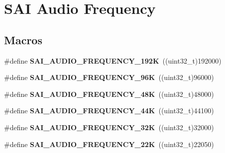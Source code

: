 \hypertarget{group___s_a_i___audio___frequency}{}\section{S\+AI Audio Frequency}
\label{group___s_a_i___audio___frequency}
\subsection*{Macros}
\begin{DoxyCompactItemize}
\item 
\#define {\bfseries S\+A\+I\+\_\+\+A\+U\+D\+I\+O\+\_\+\+F\+R\+E\+Q\+U\+E\+N\+C\+Y\+\_\+192K}~((uint32\+\_\+t)192000)\hypertarget{group___s_a_i___audio___frequency_gaf1c052df0b291587c65f10f588e5a9fd}{}\label{group___s_a_i___audio___frequency_gaf1c052df0b291587c65f10f588e5a9fd}

\item 
\#define {\bfseries S\+A\+I\+\_\+\+A\+U\+D\+I\+O\+\_\+\+F\+R\+E\+Q\+U\+E\+N\+C\+Y\+\_\+96K}~((uint32\+\_\+t)96000)\hypertarget{group___s_a_i___audio___frequency_gaed1c513d0a9120d14c2aa24196d09b1e}{}\label{group___s_a_i___audio___frequency_gaed1c513d0a9120d14c2aa24196d09b1e}

\item 
\#define {\bfseries S\+A\+I\+\_\+\+A\+U\+D\+I\+O\+\_\+\+F\+R\+E\+Q\+U\+E\+N\+C\+Y\+\_\+48K}~((uint32\+\_\+t)48000)\hypertarget{group___s_a_i___audio___frequency_ga36c076f0d366e6b0e2a5226eda50d81a}{}\label{group___s_a_i___audio___frequency_ga36c076f0d366e6b0e2a5226eda50d81a}

\item 
\#define {\bfseries S\+A\+I\+\_\+\+A\+U\+D\+I\+O\+\_\+\+F\+R\+E\+Q\+U\+E\+N\+C\+Y\+\_\+44K}~((uint32\+\_\+t)44100)\hypertarget{group___s_a_i___audio___frequency_ga4a4de6590d6e13b894211251a44999ca}{}\label{group___s_a_i___audio___frequency_ga4a4de6590d6e13b894211251a44999ca}

\item 
\#define {\bfseries S\+A\+I\+\_\+\+A\+U\+D\+I\+O\+\_\+\+F\+R\+E\+Q\+U\+E\+N\+C\+Y\+\_\+32K}~((uint32\+\_\+t)32000)\hypertarget{group___s_a_i___audio___frequency_ga9898aeb3852f70814b529565354f47da}{}\label{group___s_a_i___audio___frequency_ga9898aeb3852f70814b529565354f47da}

\item 
\#define {\bfseries S\+A\+I\+\_\+\+A\+U\+D\+I\+O\+\_\+\+F\+R\+E\+Q\+U\+E\+N\+C\+Y\+\_\+22K}~((uint32\+\_\+t)22050)\hypertarget{group___s_a_i___audio___frequency_ga40f59e4032efebbe2140667123a19dbc}{}\label{group___s_a_i___audio___frequency_ga40f59e4032efebbe2140667123a19dbc}


\end{DoxyCompactItemize}
